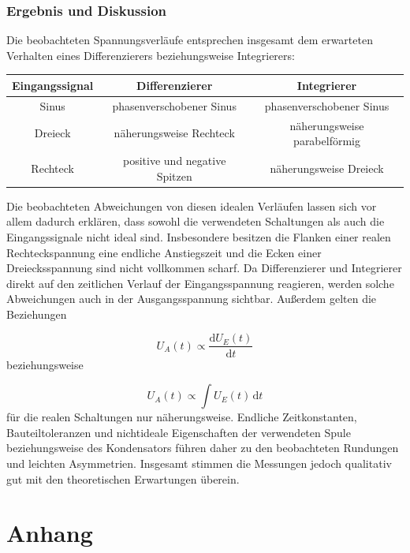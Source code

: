 \documentclass{report}
\begin{document}
\subsection{Ergebnis und Diskussion}
\noindent
Die beobachteten Spannungsverläufe entsprechen insgesamt dem erwarteten Verhalten eines Differenzierers beziehungsweise Integrierers:

\begin{center}
\begin{tabular}{c|c|c}
Eingangssignal & Differenzierer & Integrierer\\
\hline
Sinus & phasenverschobener Sinus & phasenverschobener Sinus\\
Dreieck & näherungsweise Rechteck & näherungsweise parabelförmig\\
Rechteck & positive und negative Spitzen & näherungsweise Dreieck
\end{tabular}
\end{center}
\noindent
Die beobachteten Abweichungen von diesen idealen Verläufen lassen sich vor allem dadurch erklären, dass sowohl die verwendeten Schaltungen als auch die Eingangssignale nicht ideal sind. Insbesondere besitzen die Flanken einer realen Rechteckspannung eine endliche Anstiegszeit und die Ecken einer Dreiecksspannung sind nicht vollkommen scharf. Da Differenzierer und Integrierer direkt auf den zeitlichen Verlauf der Eingangsspannung reagieren, werden solche Abweichungen auch in der Ausgangsspannung sichtbar.
\noindent
Außerdem gelten die Beziehungen

\begin{equation}
U_A(t)\propto\frac{\mathrm{d}U_E(t)}{\mathrm{d}t}
\end{equation}
\noindent
beziehungsweise

\begin{equation}
U_A(t)\propto\int U_E(t)\,\mathrm{d}t
\end{equation}
\noindent
für die realen Schaltungen nur näherungsweise. Endliche Zeitkonstanten, Bauteiltoleranzen und nichtideale Eigenschaften der verwendeten Spule beziehungsweise des Kondensators führen daher zu den beobachteten Rundungen und leichten Asymmetrien. Insgesamt stimmen die Messungen jedoch qualitativ gut mit den theoretischen Erwartungen überein.

\newpage
\chapter{Anhang}
\end{document}
